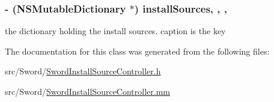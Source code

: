 \hypertarget{interface_sword_install_source_controller_ab323d28629b6cfc7b2a4569c687a7bde}{
\subsubsection[{install\-Sources}]{\setlength{\rightskip}{0pt plus 5cm}-\/ (N\-S\-Mutable\-Dictionary $\ast$) install\-Sources\hspace{0.3cm}{\ttfamily [read]}, {\ttfamily [write]}, {\ttfamily [atomic]}, {\ttfamily [retain]}}}\label{interface_sword_install_source_controller_ab323d28629b6cfc7b2a4569c687a7bde}
the dictionary holding the install sources. caption is the key 

The documentation for this class was generated from the following files\-:\begin{DoxyCompactItemize}
\item 
src/\-Sword/\hyperlink{_sword_install_source_controller_8h}{Sword\-Install\-Source\-Controller.\-h}\item 
src/\-Sword/\hyperlink{_sword_install_source_controller_8mm}{Sword\-Install\-Source\-Controller.\-mm}\end{DoxyCompactItemize}
